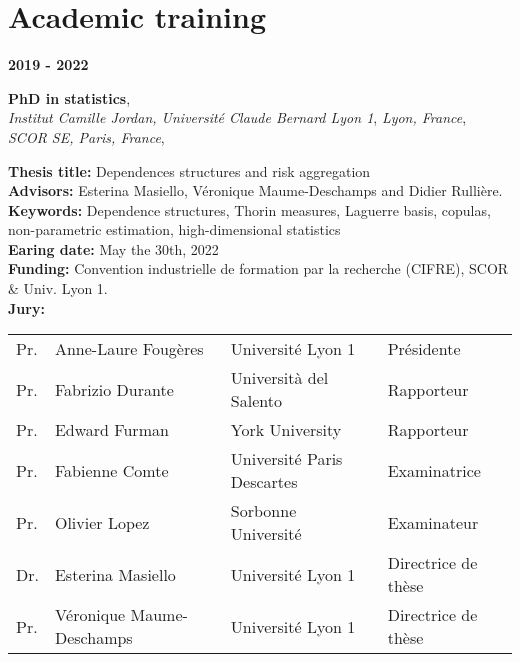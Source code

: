 \documentclass[a4paper,11pt]{article}
\newcommand{\tabcv}[2]{
\begin{minipage}[t]{0.12\linewidth}
\textbf{\footnotesize #1}
\end{minipage}\hfill
\begin{minipage}[t]{0.85\linewidth}
#2
\end{minipage}
\vspace{1em}
}
\newcommand{\bull}[1]{\textbf{#1}}
\begin{document}
\section{Academic training}\label{subsec:formation_academique}

\tabcv{2019 - 2022}{
\textbf{PhD in statistics},\\ 
\textit{Institut Camille Jordan, Université Claude Bernard Lyon 1}, \textit{Lyon, France}, \\
\textit{SCOR SE, Paris, France}, \\[0.5em]
{\footnotesize 
  \bull{Thesis title:} {Dependences structures and risk aggregation}\\
  \bull{Advisors:} Esterina Masiello, Véronique Maume-Deschamps and Didier Rullière.\\
  \bull{Keywords:} {Dependence structures, Thorin measures, Laguerre basis, copulas, non-parametric estimation, high-dimensional statistics}\\
  \bull{Earing date:} May the 30th, 2022\\
  \bull{Funding:} Convention industrielle de formation par la recherche (CIFRE), SCOR \& Univ. Lyon 1.\\
  \bull{Jury:} \\[0.25em]
  \begin{tabular}{llll}
    {Pr.} & {Anne-Laure Fougères}       & {Université Lyon 1} & {Présidente} \\
    {Pr.} & {Fabrizio Durante}          & {Università del Salento} & {Rapporteur} \\
    {Pr.} & {Edward Furman}             & {York University} & {Rapporteur} \\
    {Pr.} & {Fabienne Comte}            & {Université Paris Descartes} & {Examinatrice} \\
    {Pr.} & {Olivier Lopez}             & {Sorbonne Université} & {Examinateur} \\
    {Dr.} & {Esterina Masiello}         & {Université Lyon 1} & {Directrice de thèse} \\
    {Pr.} & {Véronique Maume-Deschamps} & {Université Lyon 1} & {Directrice de thèse} \\
  \end{tabular}
}
}
\end{document}
